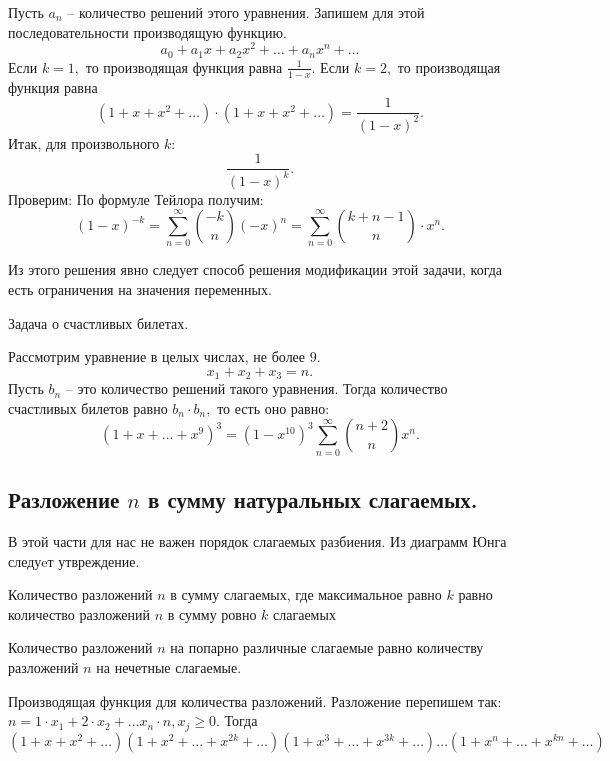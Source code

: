 \begin{solution}
    Пусть $a_n$ -- количество решений этого уравнения. Запишем для этой последовательности производящую функцию.
    $$a_0 + a_1 x + a_2 x^2 + \ldots + a_n x^{n} + \ldots$$
    Если $k = 1, $ то производящая функция равна $\frac{1}{1 - x}.$
    Если $k = 2,$ то производящая функция равна
    $$(1 + x + x^2 + \ldots) \cdot (1 + x + x^2 + \ldots) = \frac{1}{(1 - x) ^ 2}.$$
     Итак, для произвольного $k:$
     $$\frac{1}{(1 - x) ^ k}.$$
     Проверим:
     По формуле Тейлора получим:
     $$(1 - x) ^ {-k} = \sum_{n = 0}^{\infty} \binom{-k}{n}(-x)^n = \sum_{n = 0}^{\infty} \binom{k + n - 1}{n} \cdot x^n.$$
\end{solution}

Из этого решения явно следует способ решения модификации этой задачи, когда есть ограничения на значения переменных. 

\begin{problem}
    Задача о счастливых билетах.
\end{problem}

\begin{solution}
    Рассмотрим уравнение в целых числах, не более $9.$
    $$x_1 + x_2 + x_3 = n.$$
    Пусть $b_n$ -- это количество решений такого уравнения. Тогда количество счастливых билетов равно $b_n \cdot b_n,$ то есть оно равно:
    $$(1 + x + \ldots + x^9)^3 = (1 - x^{10})^3 \sum_{n = 0}^{\infty} \binom{n + 2}{n} x^n.$$
\end{solution}

\subsection{Разложение $n$ в сумму натуральных слагаемых.}

В этой части для нас не важен порядок слагаемых разбиения.
Из диаграмм Юнга следуeт утвреждение.

\begin{lemma}
    Количество разложений $n$ в сумму слагаемых, где максимальное равно $k$ равно количество разложений $n$ в сумму ровно $k$ слагаемых
\end{lemma}

\begin{lemma}
Количество разложений $n$ на попарно различные слагаемые равно количеству разложений $n$ на нечетные слагаемые.
\end{lemma}

Производящая функция для количества разложений. Разложение перепишем так: $n = 1 \cdot x_{1} + 2 \cdot x_{2} + \ldots x_n \cdot n, x_j \geq 0.$ Тогда 
$$(1 + x + x^2 + \ldots) (1 + x ^ 2 + \ldots + x^{2k} + \ldots) (1 + x ^ 3 + \ldots + x^{3k} + \ldots) \ldots (1 + x ^ n + \ldots + x^{kn} + \ldots) $$
